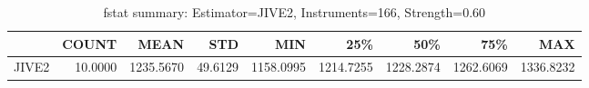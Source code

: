 \begin{table}[ht]
\centering
\caption{fstat summary: Estimator=JIVE2, Instruments=166, Strength=0.60}
\begin{tabular}{lrrrrrrrr}
\toprule
 & COUNT & MEAN & STD & MIN & 25\% & 50\% & 75\% & MAX \\
\midrule
JIVE2 & 10.0000 & 1235.5670 & 49.6129 & 1158.0995 & 1214.7255 & 1228.2874 & 1262.6069 & 1336.8232 \\
\bottomrule
\end{tabular}
\end{table}
